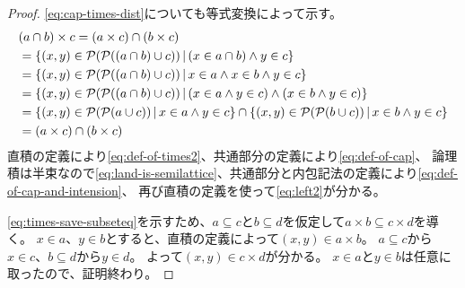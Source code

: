 \documentclass[uplatex,papersize,dvipdfmx]{jsarticle}
\begin{document}
\begin{corollary}
\begin{proof}
        \eqref{eq:cap-times-dist}についても等式変換によって示す。
        \begin{align}
          & (a \cap b) \times c = (a \times c) \cap (b \times c) \\
          & = \{  (x, y) \in \mathcal{P}(\mathcal{P}((a \cap b) \cup c)) \, | \, (x \in a \cap b) \land y \in c \} \label{eq:def-of-times2}\\
          & = \{ (x, y) \in \mathcal{P}(\mathcal{P}((a \cap b) \cup c)) \, | \, x \in a \land x \in b \land y \in c \} \label{eq:def-of-cap}\\
          & = \{ (x, y) \in \mathcal{P}(\mathcal{P}((a \cap b) \cup c)) \, | \, (x \in a \land y \in c) \land (x \in b \land y \in c) \} \label{eq:land-is-semilattice}\\
          & = \{ (x, y) \in \mathcal{P}(\mathcal{P}(a \cup c)) \, | \, x \in a \land y \in c \} \cap \{ (x, y) \in \mathcal{P}(\mathcal{P}(b \cup c)) \, | \, x \in b \land y \in c \} \label{eq:def-of-cap-and-intension}\\
          & = (a \times c) \cap (b \times c) \label{eq:left2}
        \end{align}
        直積の定義により\eqref{eq:def-of-times2}、共通部分の定義により\eqref{eq:def-of-cap}、
        論理積は半束なので\eqref{eq:land-is-semilattice}、共通部分と内包記法の定義により\eqref{eq:def-of-cap-and-intension}、
        再び直積の定義を使って\eqref{eq:left2}が分かる。

        \eqref{eq:times-save-subseteq}を示すため、$a \subseteq c$と$b \subseteq d$を仮定して$a \times b \subseteq c \times d$を導く。
        $x \in a$、$y \in b$とすると、直積の定義によって$(x, y) \in a \times b$。
        $a \subseteq c$から$x \in c$、$b \subseteq d$から$y \in d$。
        よって$(x, y) \in c \times d$が分かる。
        $x \in a$と$y \in b$は任意に取ったので、証明終わり。
      \end{proof}
    \end{corollary}
\end{document}
